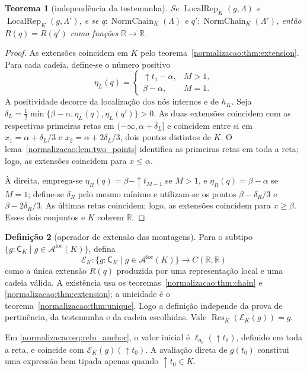\documentclass[12pt,a4paper]{article}
\theoremstyle{preciso}
\newtheorem{teorema}{Teorema}[section]
\theoremstyle{definition}
\newtheorem{definicao}[teorema]{Definição}
\newcommand{\R}{\mathbb R}
\newcommand{\CK}{\mathsf C_K}
\newcommand{\Loc}{\operatorname{LocalRep}}
\newcommand{\Res}{\operatorname{Res}}
\newcommand{\Aloc}{\mathcal A^{\mathrm{loc}}}
\theoremstyle{preciso}
\theoremstyle{preciso}
\theoremstyle{preciso}
\theoremstyle{preciso}
\theoremstyle{definition}
\theoremstyle{preciso}
\theoremstyle{definition}
\theoremstyle{preciso}
\theoremstyle{preciso}
\theoremstyle{definition}
\begin{document}
\begin{teorema}[independência da testemunha]\label{map:normalizacao:8.6}\label{normalizacao:thm:unique}
Se $\Loc_K(g,\Lambda)$ e $\Loc_K(g,\Lambda')$, e se
$q:\operatorname{NormChain}_K(\Lambda)$ e
$q':\operatorname{NormChain}_K(\Lambda')$, então
$R(q)=R(q')$ como funções $\R\to\R$.
\end{teorema}
\begin{proof}
As extensões coincidem em $K$ pelo teorema~\ref{normalizacao:thm:extension}.
Para cada cadeia, define-se o número positivo
\[
 \eta_L(q)=\begin{cases}
 \uparrow t_1-\alpha,&M>1,\\
 \beta-\alpha,&M=1.
 \end{cases}
\]
A positividade decorre da localização dos nós internos e de $h_K$.
Seja
$\delta_L=\tfrac12\min\{\beta-\alpha,\eta_L(q),\eta_L(q')\}>0$.
As duas extensões coincidem com as respectivas primeiras retas em
$(-\infty,\alpha+\delta_L]$ e coincidem entre si em
$x_1=\alpha+\delta_L/3$ e
$x_2=\alpha+2\delta_L/3$, dois pontos distintos de $K$.
O lema~\ref{normalizacao:lem:two_points} identifica as primeiras retas
em toda a reta; logo, as extensões coincidem para $x\le\alpha$.

À direita, emprega-se
$\eta_R(q)=\beta-\uparrow t_{M-1}$ se $M>1$, e
$\eta_R(q)=\beta-\alpha$ se $M=1$; define-se $\delta_R$
pelo mesmo mínimo e utilizam-se os pontos
$\beta-\delta_R/3$ e $\beta-2\delta_R/3$.
As últimas retas coincidem; logo, as extensões coincidem para
$x\ge\beta$. Esses dois conjuntos e $K$ cobrem $\R$.
\end{proof}

\begin{definicao}[operador de extensão das montagens]\label{map:normalizacao:8.7}
Para o subtipo $\{g:\CK\mid g\in\Aloc(K)\}$, defina
\[
 \mathcal E_K:\{g:\CK\mid g\in\Aloc(K)\}\longrightarrow C(\R,\R)
\]
como a única extensão $R(q)$ produzida por uma representação local
e uma cadeia válida. A existência usa os
teoremas~\ref{normalizacao:thm:chain} e \ref{normalizacao:thm:extension}; a unicidade é o
teorema~\ref{normalizacao:thm:unique}. Logo a definição independe da prova de
pertinência, da testemunha e da cadeia escolhidas. Vale
$\Res_K(\mathcal E_K(g))=g$.
\end{definicao}

Em \eqref{normalizacao:eq:relu_anchor}, o valor inicial é
$\ell_{a_0}(\uparrow t_0)$, definido em toda a reta, e coincide com
$\mathcal E_K(g)(\uparrow t_0)$. A avaliação direta de $g(t_0)$
constitui uma expressão bem tipada apenas quando $\uparrow t_0\in K$.
\end{document}
